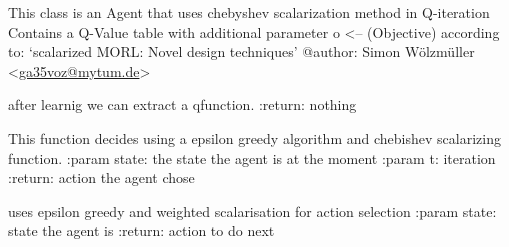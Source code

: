\documentclass[letterpaper,10pt,english]{sphinxmanual}
\begin{document}
\begin{fulllineitems}
\label{Agents:morl_agents.MORLScalarizingAgent}
This class is an Agent that uses chebyshev scalarization method in Q-iteration
Contains a Q-Value table with additional parameter o \textless{}-- (Objective)
according to: `scalarized MORL: Novel design techniques'
@author: Simon Wölzmüller \textless{}\href{mailto:ga35voz@mytum.de}{ga35voz@mytum.de}\textgreater{}

\begin{fulllineitems}
\label{Agents:morl_agents.MORLScalarizingAgent.create_scalar_Q_table}
after learnig we can extract a qfunction.
:return: nothing

\end{fulllineitems}


\begin{fulllineitems}
\label{Agents:morl_agents.MORLScalarizingAgent.decide}
This function decides using a epsilon greedy algorithm and chebishev scalarizing function.
:param state: the state the agent is at the moment
:param t: iteration
:return: action the agent chose

\end{fulllineitems}


\begin{fulllineitems}
\label{Agents:morl_agents.MORLScalarizingAgent.get_learned_action}
uses epsilon greedy and weighted scalarisation for action selection
:param state: state the agent is
:return: action to do next

\end{fulllineitems}



\end{fulllineitems}
\end{document}
